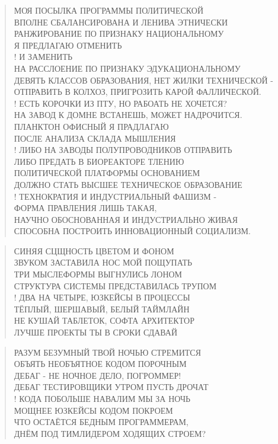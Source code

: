 \poemtitle{***}
\begin{verse}
МОЯ ПОСЫЛКА ПРОГРАММЫ ПОЛИТИЧЕСКОЙ\\
ВПОЛНЕ СБАЛАНСИРОВАНА И ЛЕНИВА ЭТНИЧЕСКИ\\
РАНЖИРОВАНИЕ ПО ПРИЗНАКУ НАЦИОНАЛЬНОМУ\\
Я ПРЕДЛАГАЮ ОТМЕНИТЬ\\!
И ЗАМЕНИТЬ\\
НА РАССЛОЕНИЕ ПО ПРИЗНАКУ ЭДУКАЦИОНАЛЬНОМУ\\
ДЕВЯТЬ КЛАССОВ ОБРАЗОВАНИЯ, НЕТ ЖИЛКИ ТЕХНИЧЕСКОЙ - \\
ОТПРАВИТЬ В КОЛХОЗ, ПРИГРОЗИТЬ КАРОЙ ФАЛЛИЧЕСКОЙ.\\!
ЕСТЬ КОРОЧКИ ИЗ ПТУ, НО РАБОАТЬ НЕ ХОЧЕТСЯ?\\
НА ЗАВОД К ДОМНЕ ВСТАНЕШЬ, МОЖЕТ НАДРОЧИТСЯ.\\
ПЛАНКТОН ОФИСНЫЙ Я ПРАДЛАГАЮ\\
ПОСЛЕ АНАЛИЗА СКЛАДА МЫШЛЕНИЯ\\!
ЛИБО НА ЗАВОДЫ ПОЛУПРОВОДНИКОВ ОТПРАВИТЬ\\
ЛИБО ПРЕДАТЬ В БИОРЕАКТОРЕ ТЛЕНИЮ\\
ПОЛИТИЧЕСКОЙ ПЛАТФОРМЫ ОСНОВАНИЕМ\\
ДОЛЖНО СТАТЬ ВЫСШЕЕ ТЕХНИЧЕСКОЕ ОБРАЗОВАНИЕ\\!
ТЕХНОКРАТИЯ И ИНДУСТРИАЛЬНЫЙ ФАШИЗМ -\\
ФОРМА ПРАВЛЕНИЯ ЛИШЬ ТАКАЯ,\\
НАУЧНО ОБОСНОВАННАЯ И ИНДУСТРИАЛЬНО ЖИВАЯ\\
СПОСОБНА ПОСТРОИТЬ ИННОВАЦИОННЫЙ СОЦИАЛИЗМ.
\end{verse}

\poemtitle{***}
\begin{verse}
СИНЯЯ СЦЩНОСТЬ ЦВЕТОМ И ФОНОМ\\
ЗВУКОМ ЗАСТАВИЛА НОС МОЙ ПОЩУПАТЬ\\
ТРИ МЫСЛЕФОРМЫ ВЫГНУЛИСЬ ЛОНОМ\\
СТРУКТУРА СИСТЕМЫ ПРЕДСТАВИЛАСЬ ТРУПОМ\\!
ДВА НА ЧЕТЫРЕ, ЮЗКЕЙСЫ В ПРОЦЕССЫ\\
ТЁПЛЫЙ, ШЕРШАВЫЙ, БЕЛЫЙ ТАЙМЛАЙН\\
НЕ КУШАЙ ТАБЛЕТОК, СОФТА АРХИТЕКТОР\\
ЛУЧШЕ ПРОЕКТЫ ТЫ В СРОКИ СДАВАЙ
\end{verse}

\poemtitle{***}
\begin{verse}
РАЗУМ БЕЗУМНЫЙ ТВОЙ НОЧЬЮ СТРЕМИТСЯ \\
ОБЪЯТЬ НЕОБЪЯТНОЕ КОДОМ ПОРОЧНЫМ\\
ДЕБАГ - НЕ НОЧНОЕ ДЕЛО, ПОГРОММЕР!\\
ДЕБАГ ТЕСТИРОВЩИКИ УТРОМ ПУСТЬ ДРОЧАТ\\!
КОДА ПОБОЛЬШЕ НАВАЛИМ МЫ ЗА НОЧЬ\\
МОЩНЕЕ ЮЗКЕЙСЫ КОДОМ ПОКРОЕМ\\
ЧТО ОСТАЁТСЯ БЕДНЫМ ПРОГРАММЕРАМ,\\
ДНЁМ ПОД ТИМЛИДЕРОМ ХОДЯЩИХ СТРОЕМ?
\end{verse}

